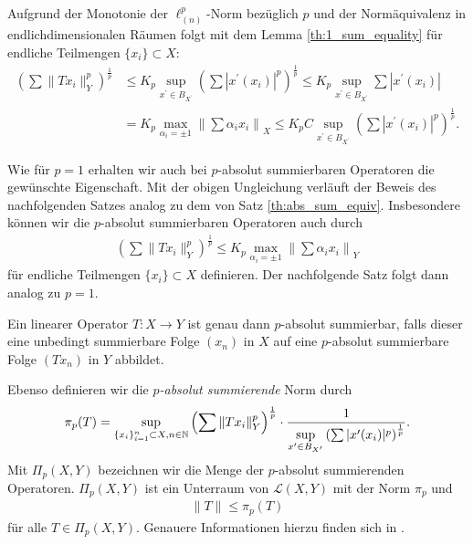 Aufgrund der Monotonie der $ \ell_{(n)}^p $-Norm bezüglich $ p $ und der Normäquivalenz in endlichdimensionalen Räumen folgt mit dem Lemma \ref{th:1_sum_equality} für endliche Teilmengen $ \{x_i\} \subset X $:
\begin{align*}
	\left(\sum \| T x_i \|_Y^p \right)^\frac{1}{p}
	&\leq
	K_p 
	\sup \limits_{ x^\prime \in B_{X^\prime}} 
	\left(
	\sum 
	|x^\prime(x_i)|^p
	\right)^\frac{1}{p}
	\leq
	K_p 
	\sup \limits_{ x^\prime \in B_{X^\prime}} 
	\sum 
	|x^\prime(x_i)|\\
	&=
	K_p \max \limits_{\alpha_i = \pm 1} \left\| \sum \alpha_i x_i \right\|_X
	\leq
	K_p C
		\sup \limits_{ x^\prime \in B_{X^\prime}} 
	\left(
	\sum 
	|x^\prime(x_i)|^p
	\right)^\frac{1}{p}.
\end{align*}

Wie für $ p = 1 $ erhalten wir auch bei $ p $-absolut summierbaren Operatoren die gewünschte Eigenschaft.
Mit der obigen Ungleichung verläuft der Beweis des nachfolgenden Satzes analog zu dem von Satz \ref{th:abs_sum_equiv}.
Insbesondere können wir die $ p $-absolut summierbaren Operatoren auch durch
\begin{align*}
	\left(\sum \| T x_i \|_{Y}^p\right)^\frac{1}{p} 
	\leq K_p 
	\max \limits_{\alpha_i = \pm 1}
	\left\|
	\sum \alpha_i  x_i
	\right\|_{Y}
\end{align*}
für endliche Teilmengen $ \{x_i\} \subset X $ definieren.
Der nachfolgende Satz folgt dann analog zu $ p=1 $.
\begin{sz}
	Ein linearer Operator $ T : X \to Y $ ist genau dann $ p $-absolut summierbar, falls dieser eine unbedingt summierbare Folge $ (x_n) $ in $ X $ auf eine $ p $-absolut summierbare Folge $ (Tx_n) $ in $ Y $ abbildet.
\end{sz}
Ebenso definieren wir die \textit{$ p $-absolut summierende} Norm durch
\begin{align*}
\pi_p(T)
=
\sup \limits_{\{x_i\}_{i=1}^n \subset X, n \in \mathbb{N}}
\left(\sum \| T x_i \|_{Y}^p\right)^\frac{1}{p}  \cdot \frac{1}{\sup \limits_{ x^\prime \in B_{X^\prime}} 
	\left(
	\sum 
	|x^\prime(x_i)|^p
	\right)^\frac{1}{p}}.
\end{align*}
Mit $ \Pi_p(X,Y) $ bezeichnen wir die Menge der $ p $-absolut summierenden Operatoren.
$ \Pi_p(X,Y) $ ist ein Unterraum von $ \mathcal{L}(X,Y) $ mit der Norm $ \pi_p $ und
\begin{align*}
	\| T \| \leq \pi_p(T)
\end{align*}
für alle $ T \in \Pi_p(X,Y) $. Genauere Informationen hierzu finden sich in \cite[Chapter 2 -4]{Diestel1995}.



